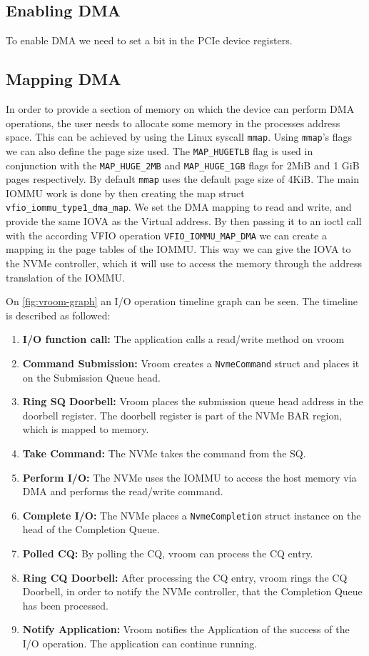 \subsection{Enabling DMA}
To enable DMA we need to set a bit in the PCIe device registers.

\subsection{Mapping DMA}
In order to provide a section of memory on which the device can perform DMA operations, the user needs to allocate some memory in the processes address space. This can be achieved by using the Linux syscall \texttt{mmap}.
Using \texttt{mmap}'s flags we can also define the page size used.
The \texttt{MAP\_HUGETLB} flag is used in conjunction with the \texttt{MAP\_HUGE\_2MB} and \texttt{MAP\_HUGE\_1GB} flags for 2MiB and 1 GiB pages respectively.
By default \texttt{mmap} uses the default page size of 4KiB.
The main IOMMU work is done by then creating the map struct \texttt{vfio\_iommu\_type1\_dma\_map}. We set the DMA mapping to read and write, and provide the same IOVA as the Virtual address. By then passing it to an ioctl call with the according VFIO operation \texttt{VFIO\_IOMMU\_MAP\_DMA} we can create a mapping in the page tables of the IOMMU. This way we can give the IOVA to the NVMe controller, which it will use to access the memory through the address translation of the IOMMU.

On \autoref{fig:vroom-graph} an I/O operation timeline graph can be seen. The timeline is described as followed:
\begin{enumerate}
    \item \textbf{I/O function call:} The application calls a read/write method on vroom
    \item \textbf{Command Submission:} Vroom creates a \texttt{NvmeCommand} struct and places it on the Submission Queue head.
    \item \textbf{Ring SQ Doorbell:} Vroom places the submission queue head address in the doorbell register. The doorbell register is part of the NVMe BAR region, which is mapped to memory.
    \item \textbf{Take Command:} The NVMe takes the command from the SQ.
    \item \textbf{Perform I/O:} The NVMe uses the IOMMU to access the host memory via DMA and performs the read/write command.
    \item \textbf{Complete I/O:} The NVMe places a \texttt{NvmeCompletion} struct instance on the head of the Completion Queue.
    \item \textbf{Polled CQ:} By polling the CQ, vroom can process the CQ entry.
    \item \textbf{Ring CQ Doorbell:} After processing the CQ entry, vroom rings the CQ Doorbell, in order to notify the NVMe controller, that the Completion Queue has been processed.
    \item \textbf{Notify Application:} Vroom notifies the Application of the success of the I/O operation. The application can continue running.
\end{enumerate}

